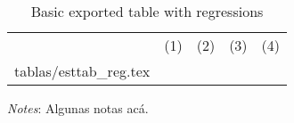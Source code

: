 \documentclass{article}
\makeatletter
\newcommand\primitiveinput[1]
{\@@input #1 }
\makeatother
\begin{document}
\begin{table}[H]
	\centering
	\label{tab:Table2}
	\begin{adjustbox}{max width=\linewidth}
		\begin{threeparttable}
			\caption{Basic exported table with regressions}
			\begin{tabular}{@{}l*{4}{c}@{}}
        \toprule
        \toprule 
				& (1) & (2) & (3) & (4) \\
				\primitiveinput{tablas/esttab_reg.tex}
				\bottomrule
			\end{tabular}
			\begin{tablenotes}
				\setlength{}
				\footnotesize
				\item \textit{Notes}: Algunas notas acá.
			\end{tablenotes}
		\end{threeparttable}
	\end{adjustbox}
\end{table}

\end{document}
